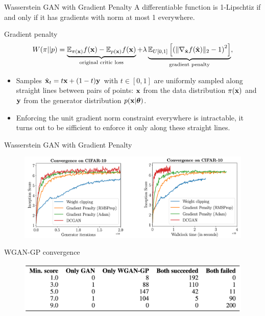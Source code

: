 \begin{frame}{Wasserstein GAN with Gradient Penalty}
	A differentiable function is 1-Lipschtiz if and only if it has gradients with norm at most 1 everywhere.
	\begin{block}{Gradient penalty}
		\[
			W(\pi || p) = \underbrace{\mathbb{E}_{\pi(\mathbf{x})} f(\mathbf{x})  - \mathbb{E}_{p(\mathbf{x})} f(\mathbf{x})}_{\text{original critic loss}} + \lambda \underbrace{\mathbb{E}_{U[0, 1]} \left[ \left( \| \nabla_{\hat{\mathbf{x}}} f(\hat{\mathbf{x}}) \|_2 - 1 \right) ^ 2\right]}_{\text{gradient penalty}},
		\]
	\end{block}
	\begin{itemize}
		\item Samples $\hat{\mathbf{x}}_t = t \mathbf{x} + (1 - t) \mathbf{y}$ with $t \in [0, 1]$ are uniformly sampled along straight lines between pairs of points: $\mathbf{x}$ from the data distribution $\pi(\mathbf{x})$ and $\mathbf{y}$ from the generator distribution $p(\mathbf{x} | \boldsymbol{\theta})$.
		\item Enforcing the unit gradient norm constraint everywhere is intractable, it turns out to be sifficient to enforce it only along these straight lines.
	\end{itemize}

\end{frame}
\begin{frame}{Wasserstein GAN with Gradient Penalty}
	\begin{figure}
		\centering
		\includegraphics[width=\linewidth]{figs/wgan_gp_convergence}
	\end{figure}
	\begin{block}{WGAN-GP convergence}
		\begin{figure}
			\centering
			\includegraphics[width=0.75\linewidth]{figs/wgan_gp_wgan}
		\end{figure}
	\end{block}

\end{frame}

